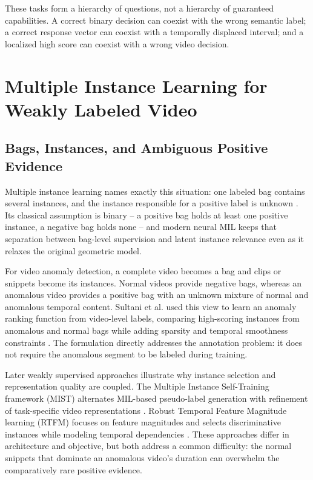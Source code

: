 These tasks form a hierarchy of questions, not a hierarchy of guaranteed
capabilities. A correct binary decision can coexist with the wrong semantic
label; a correct response vector can coexist with a temporally displaced
interval; and a localized high score can coexist with a wrong video decision.

\section{Multiple Instance Learning for Weakly Labeled Video}
\label{sec:background-mil}

\subsection{Bags, Instances, and Ambiguous Positive Evidence}

Multiple instance learning names exactly this situation: one labeled bag
contains several instances, and the instance responsible for a positive label
is unknown \cite{dietterich1997solving}. Its classical assumption is binary --
a positive bag holds at least one positive instance, a negative bag holds none
-- and modern neural MIL keeps that separation between bag-level supervision
and latent instance relevance even as it relaxes the original geometric model.

For video anomaly detection, a complete video becomes a bag and clips or
snippets become its instances. Normal videos provide negative bags, whereas an
anomalous video provides a positive bag with an unknown mixture of normal and
anomalous temporal content. Sultani et al. used this view to learn an anomaly
ranking function from video-level labels, comparing high-scoring instances from
anomalous and normal bags while adding sparsity and temporal smoothness
constraints \cite{sultani2018real}. The formulation directly addresses the
annotation problem: it does not require the anomalous segment to be labeled
during training.

Later weakly supervised approaches illustrate why instance selection and
representation quality are coupled. The Multiple Instance Self-Training
framework (MIST) alternates MIL-based pseudo-label
generation with refinement of task-specific video representations
\cite{feng2021mist}. Robust Temporal Feature Magnitude learning (RTFM) focuses on
feature magnitudes and selects discriminative
instances while modeling temporal dependencies \cite{tian2021weakly}. These
approaches differ in architecture and objective, but both address a common
difficulty: the normal snippets that dominate an anomalous video's duration can
overwhelm the comparatively rare positive evidence.

